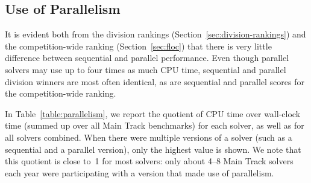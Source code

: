 \documentclass[dvipsnames,table,twoside,11pt]{article}
\newcommand{\maintrack}{Main Track\xspace}
\begin{document}
\subsection{Use of Parallelism}

It is evident both from the division rankings
(Section~\ref{sec:division-rankings}) and the competition-wide ranking
(Section~\ref{sec:floc}) that there is very little difference between
sequential and parallel performance.  Even though parallel solvers may
use up to four times as much CPU time, sequential and parallel
division winners are most often identical, as are sequential and
parallel scores for the competition-wide ranking.


In Table~\ref{table:parallelism}, we report the quotient of CPU time
over wall-clock time (summed up over all \maintrack benchmarks) for
each solver, as well as for all solvers combined.  When there were
multiple versions of a solver (such as a sequential and a parallel
version), only the highest value is shown.  We note that this quotient
is close to~1 for most solvers: only about 4--8 \maintrack solvers
each year were participating with a version that made use of
parallelism.
\end{document}
